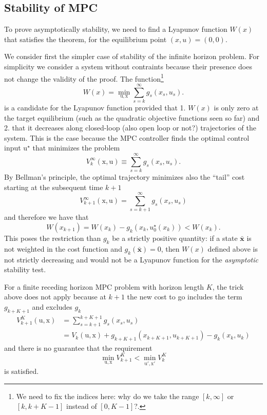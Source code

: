 \documentclass[11pt]{report}
\newcommand{\bs}[1]{\boldsymbol{#1}}
\newcommand{\bsu}{\bs{\mathrm{u}}}
\newcommand{\bsx}{\bs{\mathrm{x}}}
\begin{document}
\subsection{Stability of MPC}
\label{sec:stability-MPC}

To prove asymptotically stability, we need to find a Lyapunov function $W(x)$ that satisfies the theorem, for the equilibrium point $(x,u)=(0,0)$.

We consider first the simpler case of stability of the infinite horizon problem. For simplicity we consider a system without contraints because their presence does not change the validity of the proof. The function\footnote{We need to fix the indices here: why do   we take the range $[k,\infty]$ or $[k,k+K-1]$ instead of   $[0,K-1]$?.}
\begin{equation*}
  W(x) = \min_{\bsu,\bsx} \sum_{s=k}^\infty g_s(x_s,u_s).
\end{equation*}
is a candidate for the Lyapunov function provided that 1. $W(x)$ is only zero at the target equilibrium (such as the quadratic objective functions seen so far) and 2. that it decreases along closed-loop (also open loop or not?) trajectories of the system. This is the case because the MPC controller finds the optimal control input $\bsu^\star$ that minimizes the problem
\begin{equation*}
  V_k^\infty(\bsx,\bsu) \equiv \sum_{s=k}^\infty g_s(x_s,u_s).
\end{equation*}
By Bellman's principle, the optimal trajectory minimizes also the ``tail'' cost starting at the subsequent time $k+1$
\begin{equation*}
  V_{k+1}^\infty(\bsx,\bsu) = \sum_{s=k+1}^\infty g_s(x_s,u_s)
\end{equation*}
and therefore we have that
\begin{equation*}
  W(x_{k+1}) = W(x_k) - g_k(x_k,u_0^\star(x_k)) < W(x_k).
\end{equation*}
This poses the restriction than $g_k$ be a strictly positive quantity: if a state $\bs{\bar{x}}$ is not weighted in the cost function and $g_k(\bs{\bar{x}})=0$, then $W(x)$ defined above is not strictly decreasing and would not be a Lyapunov function for the \emph{asymptotic} stability test.

For a finite receding horizon MPC problem with horizon length $K$, the trick above does not apply because at $k+1$ the new cost to go includes the term $g_{k+K+1}$ and excludes $g_k$
\begin{align*}
  V^K_{k+1}(\bsu,\bsx) &= \sum_{s=k+1}^{k+K+1}g_s(x_s,u_s) \\
                       &= V_k(\bsu,\bsx) + g_{k+K+1}(x_{k+K+1},u_{k+K+1}) - g_k(x_k,u_k)
\end{align*}
and there is no guarantee that the requirement
\begin{equation*}
  \min_{\bsu,\bsx} V^K_{k+1} < \min_{\bsu',\bsx'} V^K_k
\end{equation*}
is satisfied.
\end{document}
